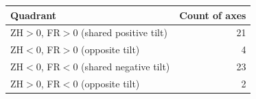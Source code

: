 \begin{tabular}{@{}lr@{}}
\toprule
Quadrant & Count of axes \\
\midrule
ZH$>$0, FR$>$0 (shared positive tilt) & 21 \\
ZH$<$0, FR$>$0 (opposite tilt) & 4 \\
ZH$<$0, FR$<$0 (shared negative tilt) & 23 \\
ZH$>$0, FR$<$0 (opposite tilt) & 2 \\
\bottomrule
\end{tabular}
